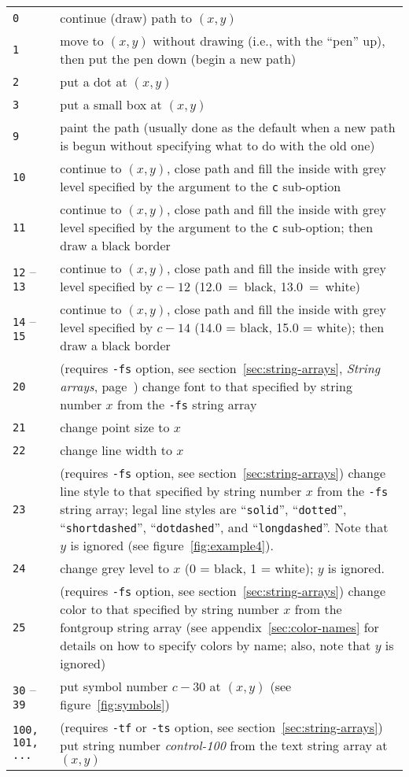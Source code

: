 \documentclass{book}
\begin{document}
\begin{center}
\begin{tabular}{p{2.5cm}p{8.5cm}}
{\tt 0} & {continue (draw) path to $(x,y)$} \\
{\tt 1} & {move to $(x,y)$ without drawing (i.e., with the ``pen''
up), then put the pen down (begin a new path)} \\
{\tt 2} & {put a dot at $(x,y)$} \\
{\tt 3} & {put a small box at $(x,y)$} \\
{\tt 9} & {paint the path (usually done as the default when a new path is begun
without specifying what to do with the old one)} \\
{\tt 10} & {continue to $(x,y)$, close path and fill the inside with grey level
specified by the argument to the {\tt c} sub-option} \\
{\tt 11} & {continue to $(x,y)$, close path and fill the inside with grey level
specified by the argument to the {\tt c} sub-option; then draw a black
border} \\
{{\tt 12} -- {\tt 13}} & {continue to $(x,y)$, close path and
fill the inside with grey level specified by $c-12$ (12.0~=~black,
13.0~=~white)} \\
{{\tt 14} -- {\tt 15}} & {continue to $(x,y)$, close path and fill the
inside with grey level specified by $c-14$ (14.0 = black, 15.0 = white);
then draw a black border} \\
{\tt 20} & {(requires {\tt -fs} option, see section~\ref{sec:string-arrays},
{\em String arrays}, page~\pageref{sec:string-arrays}) change font to that
specified by string number $x$ from the {\tt -fs} string array} \\
{\tt 21} & {change point size to $x$} \\
{\tt 22} & {change line width to $x$} \\
{\tt 23} & {(requires {\tt -fs} option, see section~\ref{sec:string-arrays})
change line style to that specified by string number $x$ from the {\tt -fs}
string array; legal line styles are ``{\tt solid}'', ``{\tt dotted}'',
``{\tt shortdashed}'', ``{\tt dotdashed}'', and ``{\tt longdashed}''.  Note
that $y$ is ignored (see figure~\ref{fig:example4}).} \\
{\tt 24} & {change grey level to $x$ (0 = black, 1 = white); $y$ is ignored.}\\
{\tt 25} & {(requires {\tt -fs} option, see section~\ref{sec:string-arrays})
change color to that specified by string number $x$ from the fontgroup
string array (see appendix~\ref{sec:color-names} for details on how to specify
colors by name; also, note that $y$ is ignored)} \\
{{\tt 30} -- {\tt 39}} & {put symbol number $c-30$ at $(x,y)$ (see
figure~\ref{fig:symbols})} \\
{\tt 100, 101, ...} & {(requires {\tt -tf} or {\tt -ts} option, see
section~\ref{sec:string-arrays}) put string number {\em control-100} from the
text string array at $(x,y)$}
\end{tabular}
\end{center}
\end{document}
